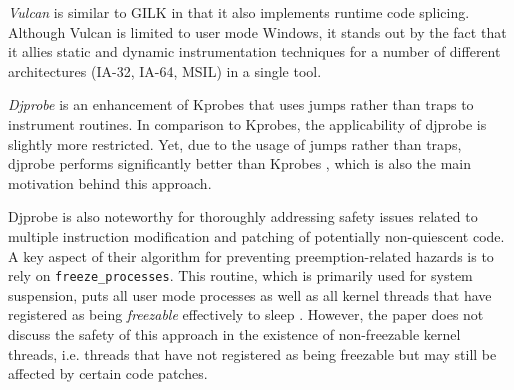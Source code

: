 \emph{Vulcan} \cite{Vulcan01} is similar to GILK in that it also implements runtime code 
splicing. Although Vulcan is limited to user mode Windows, it stands out
by the fact that it allies static and dynamic instrumentation techniques
for a number of different architectures (IA-32, IA-64, MSIL) in a single 
tool.

\emph{Djprobe} \cite{Hiramatsu07} is an enhancement of Kprobes that uses 
jumps rather than traps to instrument routines. In comparison to Kprobes,
the applicability of djprobe is slightly more restricted. Yet, due to the
usage of jumps rather than traps, djprobe performs significantly better
than Kprobes \cite{Djprobes05perf}, which is also the main motivation behind this approach.

Djprobe is also noteworthy for thoroughly addressing safety issues related
to multiple instruction modification and patching of potentially non-quiescent code.
A key aspect of their algorithm for preventing preemption-related hazards
is to rely on \verb|freeze_processes|. This routine, which is primarily used
for system suspension, puts all user mode processes as well as all kernel
threads that have registered as being \emph{freezable} effectively to sleep \cite{Wysocki08}.
However, the paper does not discuss the safety of this approach 
in the existence of non-freezable kernel threads, i.e. threads that have
not registered as being freezable but may still be affected by certain
code patches.

